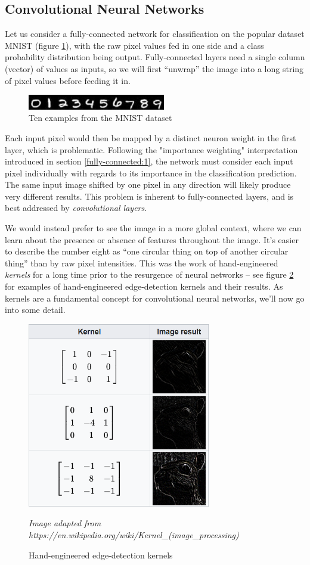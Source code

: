 \documentclass{report}
\begin{document}
\subsection{Convolutional Neural Networks} \label{cnn:1}
Let us consider a fully-connected network for classification on the popular dataset MNIST (figure \ref{fig:mnist:1}), with the raw pixel values fed in one side and a class probability distribution being output. Fully-connected layers need a single column (vector) of values as inputs, so we will first ``unwrap'' the image into a long string of pixel values before feeding it in. \par
\begin{figure}[h]
 \centering
 \includegraphics[width=6cm]{mnist}
 \caption{Ten examples from the MNIST dataset}
 \label{fig:mnist:1}
\end{figure}
Each input pixel would then be mapped by a distinct neuron weight in the first layer, which is problematic. Following the "importance weighting" interpretation introduced in section \ref{fully-connected:1}, the network must consider each input pixel individually with regards to its importance in the classification prediction. The same input image shifted by one pixel in any direction will likely produce very different results. This problem is inherent to fully-connected layers, and is best addressed by \textit{convolutional layers}. \par
We would instead prefer to see the image in a more global context, where we can learn about the presence or absence of features throughout the image. It's easier to describe the number eight as ``one circular thing on top of another circular thing'' than by raw pixel intensities. This was the work of hand-engineered \textit{kernels} for a long time prior to the resurgence of neural networks -- see figure \ref{fig:hand-eng-kernels:1} for examples of hand-engineered edge-detection kernels and their results. As kernels are a fundamental concept for convolutional neural networks, we'll now go into some detail. \par
\begin{figure}[!h]
 \centering
 \includegraphics[width=8cm]{handengkernels}
 \caption{Hand-engineered edge-detection kernels}
 \label{fig:hand-eng-kernels:1}
 \textit{Image adapted from https://en.wikipedia.org/wiki/Kernel\_(image\_processing)}
\end{figure}
\end{document}

